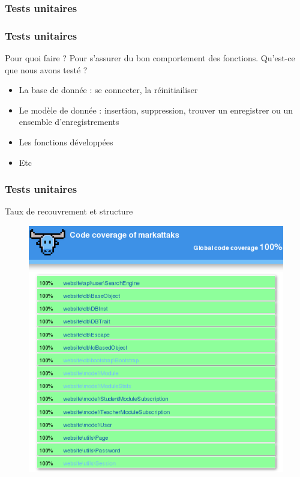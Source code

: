 \documentclass{beamer}
\begin{document}
      \subsubsection{Tests unitaires}
      \begin{frame}
        \frametitle{Tests unitaires}
        \begin{block}{Pour quoi faire ?}
          Pour s'assurer du bon comportement des fonctions. Qu'est-ce que nous avons testé ?
          \begin{itemize}
            \item La base de donnée : se connecter, la réinitiailiser
            \item Le modèle de donnée : insertion, suppression, trouver un enregistrer ou un ensemble d'enregistrements
            \item Les fonctions développées
            \item Etc
          \end{itemize}           
        \end{block}      
      \end{frame}
      \begin{frame}
        \frametitle{Tests unitaires}
        \begin{block}{Taux de recouvrement et structure}
          \begin{figure}
            \begin{center}
              \includegraphics[width=.5\textwidth]{images/atoum.png}
              \label{fig:cov_tu}
            \end{center}
          \end{figure}
        \end{block}
      \end{frame}
      
\end{document}
